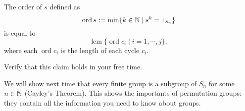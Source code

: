 \begin{claim}
   The order of $s$ defined as \[
       \operatorname{ord} s:= \operatorname{min} \{k\in \mathbb{N}  \mid s^{k}=1_{S_n}\}  
   \]
   is equal to \[
       \operatorname{lcm}\{\operatorname{ord} c_i  \mid i=1,\cdots,j\},
   \]
   where each $\operatorname{ord} c_i$ is the length of each cycle $c_i$.
\end{claim}
Verify that this claim holds in your free time.
\begin{note}
    We will show next time that every finite group is a subgroup of $S_n$ for some $n\in \mathbb{N}$ (Cayley's Theorem). This shows the importants of permutation groups: they contain all the information you need to know about groups.
\end{note}




